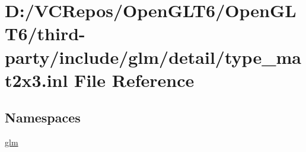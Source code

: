 \hypertarget{type__mat2x3_8inl}{}\section{D\+:/\+V\+C\+Repos/\+Open\+G\+L\+T6/\+Open\+G\+L\+T6/third-\/party/include/glm/detail/type\+\_\+mat2x3.inl File Reference}
\label{type__mat2x3_8inl}
\subsection*{Namespaces}
\begin{DoxyCompactItemize}
\item 
 \mbox{\hyperlink{namespaceglm}{glm}}
\end{DoxyCompactItemize}
